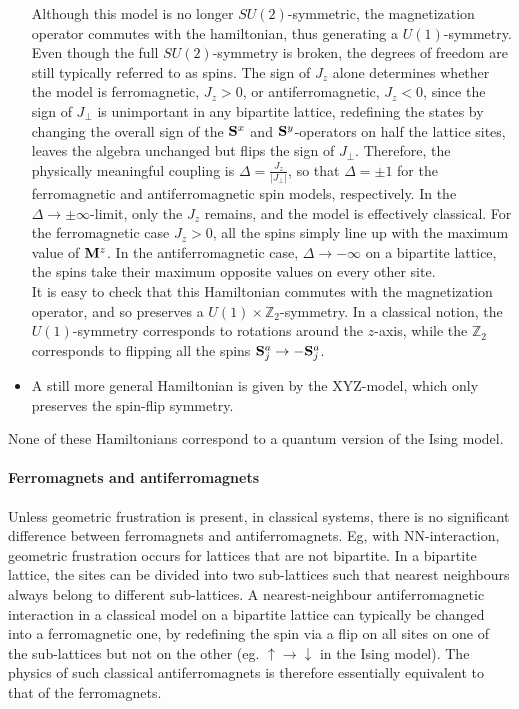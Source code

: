\documentclass{homework}
\begin{document}
\begin{itemize}
Although this model is no longer $SU(2)$-symmetric, the magnetization operator commutes with the hamiltonian, thus generating a $U(1)$-symmetry. Even though the full $SU(2)$-symmetry is broken, the degrees of freedom are still typically referred to as spins. The sign of $J_z$ alone determines whether the model is ferromagnetic, $J_z > 0$, or antiferromagnetic, $J_z < 0$, since the sign of $J_\perp$ is unimportant in any bipartite lattice, redefining the states by changing the overall sign of the ${\bf S}^x$ and ${\bf S}^y$-operators on half the lattice sites, leaves the algebra unchanged but flips the sign of $J_\perp$. Therefore, the physically meaningful coupling is $\Delta = \frac{J_z}{|J_\perp|}$, so that $\Delta = \pm 1$ for the ferromagnetic and antiferromagnetic spin models, respectively. In the $\Delta \rightarrow \pm \infty$-limit, only the $J_z$ remains, and the model is effectively classical. For the ferromagnetic case $J_z > 0$, all the spins simply line up with the maximum value of ${\bf M}^z$. In the antiferromagnetic case, $\Delta \rightarrow -\infty$ on a bipartite lattice, the spins take their maximum opposite values on every other site. \\

It is easy to check that this Hamiltonian commutes with the magnetization operator, and so preserves a $U(1)\times \mathds{Z}_2$-symmetry. In a classical notion, the $U(1)$-symmetry corresponds to rotations around the $z$-axis, while the $\mathds{Z}_2$ corresponds to flipping all the spins ${{\bf S}_j^a \rightarrow -{\bf S}_j^a}$. \\

\item A still more general Hamiltonian is given by the XYZ-model, which only preserves the spin-flip symmetry. 
\end{itemize}

None of these Hamiltonians correspond to a quantum version of the Ising model. \\

\paragraph{\textbf{Ferromagnets and antiferromagnets}}

Unless geometric frustration is present, in classical systems, there is no significant difference between ferromagnets and antiferromagnets. Eg, with NN-interaction, geometric frustration occurs for lattices that are not bipartite. In a bipartite lattice, the sites can be divided into two sub-lattices such that nearest neighbours always belong to different sub-lattices. A nearest-neighbour antiferromagnetic interaction in a classical model on a bipartite lattice can typically be changed into a ferromagnetic one, by redefining the spin via a flip on all sites on one of the sub-lattices but not on the other (eg. $\uparrow \rightarrow \downarrow$ in the Ising model). The physics of such classical antiferromagnets is therefore essentially equivalent to that of the ferromagnets. \\
\end{document}
